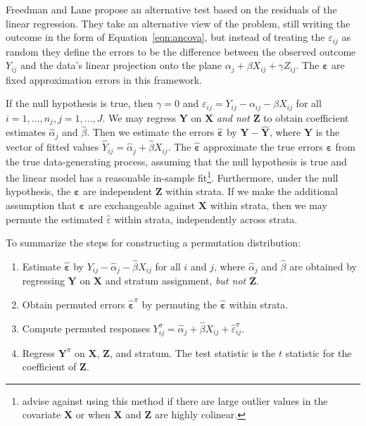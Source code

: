 \documentclass[11pt]{article}
\begin{document}
Freedman and Lane \cite{freedman_nonstochastic_1983} propose an alternative test based on the residuals of the linear regression.
They take an alternative view of the problem, still writing the outcome in the form of Equation~\ref{eqn:ancova}, but instead of treating the $\varepsilon_{ij}$ as random they define the errors to be the difference between the observed outcome $Y_{ij}$ and the data's linear projection onto the plane $\alpha_j + \beta X_{ij}+ \gamma Z_{ij}$.
The $\mathbf{\varepsilon}$ are fixed approximation errors in this framework.

If the null hypothesis is true, then $\gamma = 0$ and $\varepsilon_{ij} = Y_{ij} - \alpha_{ij} - \beta X_{ij}$ for all $i = 1, \dots, n_j, j = 1, \dots, J$.
We may regress $\mathbf{Y}$ on $\mathbf{X}$ \textit{and not $\mathbf{Z}$} to obtain coefficient estimates $\hat{\alpha}_j$ and $\hat{\beta}$.
Then we estimate the errors $\mathbf{\hat{\varepsilon}}$ by $\mathbf{Y} - \mathbf{\hat{Y}}$, where $\mathbf{\hat{Y}}$ is the vector of fitted values $\hat{Y}_{ij} = \hat{\alpha}_j + \hat{\beta}X_{ij}$.
The $\mathbf{\hat{\varepsilon}}$ approximate the true errors $\mathbf{\varepsilon}$ from the true data-generating process, assuming that the null hypothesis is true and the linear model has a reasonable in-sample fit\footnote{
\cite{freedman_nonstochastic_1983} advise against using this method if there are large outlier values in the covariate $\mathbf{X}$ or when $\mathbf{X}$ and $\mathbf{Z}$ are highly colinear.
}.
Furthermore, under the null hypothesis, the $\mathbf{\varepsilon}$ are independent $\mathbf{Z}$ within strata. 
If we make the additional assumption that $\mathbf{\varepsilon}$ are exchangeable against $\mathbf{X}$ within strata, then 
we may permute the estimated $\hat{\varepsilon}$ within strata, independently across strata.

To summarize the steps for constructing a permutation distribution:

\begin{enumerate}
\item Estimate $\mathbf{\hat{\varepsilon}}$ by $Y_{ij} - \hat{\alpha}_j - \hat{\beta} X_{ij}$ for all $i$ and $j$, where $\hat{\alpha}_j$ and $\hat{\beta}$ are obtained by regressing $\mathbf{Y}$ on $\mathbf{X}$ and stratum assignment, \textit{but not $\mathbf{Z}$}.
\item Obtain permuted errors $\mathbf{\hat{\varepsilon}}^\pi$ by permuting the $\mathbf{\hat{\varepsilon}}$ within strata.
\item Compute permuted responses $Y_{ij}^\pi = \hat{\alpha}_j + \hat{\beta} X_{ij}+ \hat{\varepsilon}_{ij}^\pi$.
\item Regress $\mathbf{Y}^\pi$ on $\mathbf{X}$, $\mathbf{Z}$, and stratum. The test statistic is the $t$ statistic for the coefficient of $\mathbf{Z}$.
\end{enumerate}
\end{document}
